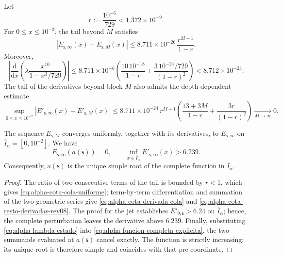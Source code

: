 Let
\[
 r:=\frac{10^{-6}}{729}<1.372\mathbin{\times}10^{-9}.
\]
For \(0\leq x\leq10^{-2}\), the tail beyond \(M\) satisfies
\begin{equation}
 \left|E_{\mathsf s,\infty}(x)-E_{\mathsf s,M}(x)\right|
 \leq
 8.711\mathbin{\times}10^{-26}\,\frac{r^{M+1}}{1-r}.
 \label{eq:alpha-cota-cola-uniforme}
\end{equation}
Moreover,
\begin{equation}
 \left|\frac{\mathrm d}{\mathrm dx}
  \left(\lambda\frac{x^{10}}{1-x^3/729}\right)\right|
 \leq 8.711\mathbin{\times}10^{-6}
 \left(\frac{10\,10^{-18}}{1-r}
 +\frac{3\,10^{-24}/729}{(1-r)^2}\right)
 <8.712\mathbin{\times}10^{-23}.
 \label{eq:alpha-cota-derivada-cola}
\end{equation}
The tail of the derivatives beyond block \(M\) also admits the
depth-dependent estimate
\begin{equation}
 \sup_{0\le x\le10^{-2}}
 \left|E'_{\mathsf s,\infty}(x)-E'_{\mathsf s,M}(x)\right|
 \le 8.711\mathbin{\times}10^{-24}\,r^{M+1}
 \left(\frac{13+3M}{1-r}+\frac{3r}{(1-r)^2}\right)
 \xrightarrow[M\to\infty]{}0.
 \label{eq:alpha-cota-resto-derivadas-rev08}
\end{equation}

\begin{theorem}
\label{thm:alpha-raiz-completa-explicita}
The sequence \(E_{\mathsf s,M}\) converges uniformly, together with its
derivatives, to \(E_{\mathsf s,\infty}\) on
\(\overline I_\alpha=[0,10^{-2}]\). We have
\begin{equation}
 E_{\mathsf s,\infty}(a(\mathsf s))=0,
 \qquad
 \inf_{x\in\overline I_\alpha}
 E'_{\mathsf s,\infty}(x)>6.239.
 \label{eq:alpha-raiz-y-derivada-completas}
\end{equation}
Consequently, \(a(\mathsf s)\) is the unique simple root of the complete
function in \(I_\alpha\).
\end{theorem}

\begin{proof}
The ratio of two consecutive terms of the tail is bounded by \(r<1\),
which gives \eqref{eq:alpha-cota-cola-uniforme}; term-by-term
differentiation and summation of the two geometric series give
\eqref{eq:alpha-cota-derivada-cola} and
\eqref{eq:alpha-cota-resto-derivadas-rev08}. The proof for the jet establishes
\(E'_{9,\mathsf s}>6.24\) on \(\overline I_\alpha\); hence, the
complete perturbation leaves the derivative above \(6.239\).
Finally, substituting \eqref{eq:alpha-lambda-estado} into
\eqref{eq:alpha-funcion-completa-explicita}, the two summands evaluated at
\(a(\mathsf s)\) cancel exactly. The function is strictly
increasing; its unique root is therefore simple and coincides with that pre-coordinate.
\end{proof}

